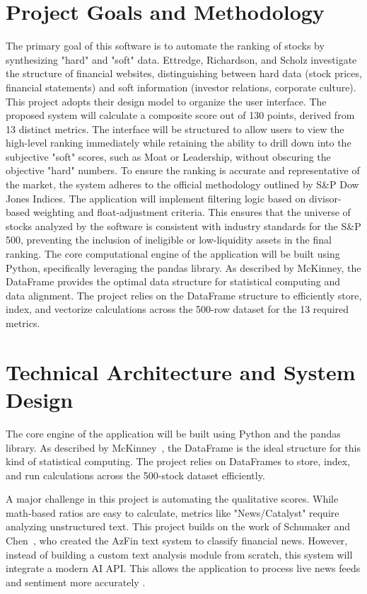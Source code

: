 \documentclass[12pt]{article}
\begin{document}
\section*{Project Goals and Methodology}
The primary goal of this software is to automate the ranking of stocks by synthesizing "hard" and "soft" data. Ettredge, Richardson, and Scholz investigate the structure of financial websites, distinguishing between hard data (stock prices, financial statements) and soft information (investor relations, corporate culture). This project adopts their design model to organize the user interface. The proposed system will calculate a composite score out of 130 points, derived from 13 distinct metrics. The interface will be structured to allow users to view the high-level ranking immediately while retaining the ability to drill down into the subjective "soft" scores, such as Moat or Leadership, without obscuring the objective "hard" numbers.
To ensure the ranking is accurate and representative of the market, the system adheres to the official methodology outlined by S\&P Dow Jones Indices. The application will implement filtering logic based on divisor-based weighting and float-adjustment criteria. This ensures that the universe of stocks analyzed by the software is consistent with industry standards for the S\&P 500, preventing the inclusion of ineligible or low-liquidity assets in the final ranking.
The core computational engine of the application will be built using Python, specifically leveraging the pandas library. As described by McKinney, the DataFrame provides the optimal data structure for statistical computing and data alignment. The project relies on the DataFrame structure to efficiently store, index, and vectorize calculations across the 500-row dataset for the 13 required metrics.
\section*{Technical Architecture and System Design}
The core engine of the application will be built using Python and the pandas library. As described by McKinney~\cite{McKinney2010Pandas}, the DataFrame is the ideal structure for this kind of statistical computing. The project relies on DataFrames to store, index, and run calculations across the 500-stock dataset efficiently.

A major challenge in this project is automating the qualitative scores. While math-based ratios are easy to calculate, metrics like "News/Catalyst" require analyzing unstructured text. This project builds on the work of Schumaker and Chen~\cite{Schumaker2009Textual}, who created the AzFin text system to classify financial news. However, instead of building a custom text analysis module from scratch, this system will integrate a modern AI API. This allows the application to process live news feeds and sentiment more accurately .
\end{document}
